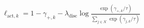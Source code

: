 \documentclass[border=4pt]{standalone}
\begin{document}
$\displaystyle
\ell_{\mathrm{act},k}=1-\gamma_{+,k}
  -\lambda_{\mathrm{disc}}\log
   \frac{\exp(\gamma_{+,k}/\tau)}
        {\sum_{j\in\mathcal K}\exp(\gamma_{j,k}/\tau)}
$
\end{document}
